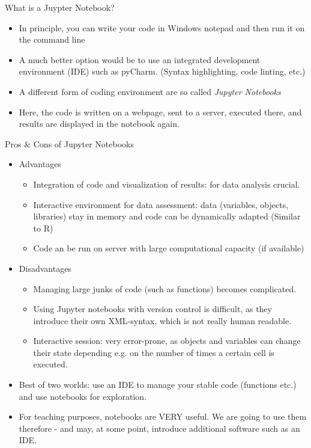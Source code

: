 \begin{frame}{What is a Juypter Notebook?}

	\begin{itemize}
		\item In principle, you can write your code in Windows notepad and then run it on the command line
		\item A much better option would be to use an integrated development environment (IDE) such as pyCharm. (Syntax highlighting, code linting, etc.)
		\item A different form of coding environment are so called \textit{Jupyter Notebooks}
		\item Here, the code is written on a webpage, sent to a server, executed there, and results are displayed in the notebook again.

	\end{itemize}


\end{frame}

\begin{frame}{Pros \& Cons of Jupyter Notebooks}

\begin{itemize}
		\item Advantages
	\begin{itemize}
		\item Integration of code and visualization of results: for data analysis crucial.
		\item Interactive environment for data assessment: data (variables, objects, libraries) stay in memory and code can be dynamically adapted (Similar to R)
		\item Code an be run on server with large computational capacity (if available)

	\end{itemize}
	\item Disadvantages
	\begin{itemize}
		\item Managing large junks of code (such as functions) becomes complicated.
		\item Using Jupyter notebooks with version control is difficult, as they introduce their own XML-syntax, which is not really human readable.
		\item Interactive session: very error-prone, as objects and variables can change their state depending e.g. on the number of times a certain cell is executed.
	\end{itemize}

	\item Best of two worlds: use an IDE to manage your stable code (functions etc.) and use notebooks for exploration.
	\item For teaching purposes, notebooks are VERY useful. We are going to use them therefore - and may, at some point, introduce additional software such as an IDE.
\end{itemize}

\end{frame}

